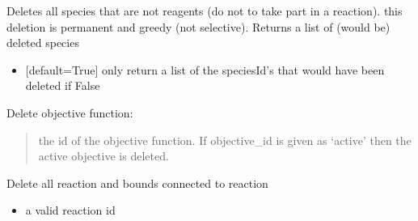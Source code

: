 \documentclass[letterpaper,10pt,english]{sphinxmanual}
\begin{document}
\begin{fulllineitems}
\begin{fulllineitems}
\begin{itemize}
\end{itemize}

\end{fulllineitems}


\begin{fulllineitems}
\label{\detokenize{modules_doc:cbmpy.CBModel.Model.deleteNonReactingSpecies}}
\pysigstartsignatures
{}
\pysigstopsignatures
\sphinxAtStartPar
Deletes all species that are not reagents (do not to take part in a reaction).
 this deletion is permanent and greedy (not selective). Returns a list of (would be) deleted species
\begin{itemize}
\item {} 
\sphinxAtStartPar
{} {[}default=True{]} only return a list of the speciesId’s that would have been deleted if False

\end{itemize}

\end{fulllineitems}


\begin{fulllineitems}
\label{\detokenize{modules_doc:cbmpy.CBModel.Model.deleteObjective}}
\pysigstartsignatures
{}
\pysigstopsignatures
\sphinxAtStartPar
Delete objective function:
\begin{quote}

\sphinxAtStartPar
{} the id of the objective function. If objective\_id is given  as ‘active’ then the active objective is deleted.
\end{quote}

\end{fulllineitems}


\begin{fulllineitems}
\label{\detokenize{modules_doc:cbmpy.CBModel.Model.deleteReactionAndBounds}}
\pysigstartsignatures
{}
\pysigstopsignatures
\sphinxAtStartPar
Delete all reaction and bounds connected to reaction
\begin{itemize}
\item {} 
\sphinxAtStartPar
{} a valid reaction id


\end{itemize}
\end{fulllineitems}
\end{fulllineitems}
\end{document}
